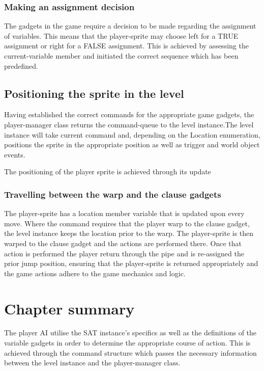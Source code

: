 \documentclass[11pt, a4paper, oneside]{report} %
\begin{document}
\subsubsection{Making an assignment decision}

The gadgets in the game require a decision to be made regarding the assignment
of variables. This means that the player-sprite may choose left for a TRUE
assignment or right for a FALSE assignment. This is achieved by assessing the
current-variable member and initiated the correct sequence which has been
predefined.


\subsection{Positioning the sprite in the level}

Having established the correct commands for the appropriate game gadgets, the
player-manager class returns the command-queue to the level instance.The level
instance will take current command and, depending on the Location enumeration,
positions the sprite in the appropriate position as well as trigger and world
object events.

The positioning of the player sprite is achieved through its update

\subsubsection{Travelling between the warp and the clause gadgets}

The player-sprite has a location member variable that is updated upon every
move. Where the command requires that the player warp to the clause gadget, the
level instance keeps the location prior to the warp. The player-sprite is then
warped to the clause gadget and the actions are performed there. Once that
action is performed the player return through the pipe and is re-assigned the
prior jump position, ensuring that the player-sprite is returned appropriately
and the game actions adhere to the game mechanics and logic.

\section{Chapter summary}

The player AI utilise the SAT instance's specifics as well as the definitions of
the variable gadgets in order to determine the appropriate course of action.
This is achieved through the command structure which passes the necessary
information between the level instance and the player-manager class.
\end{document}
